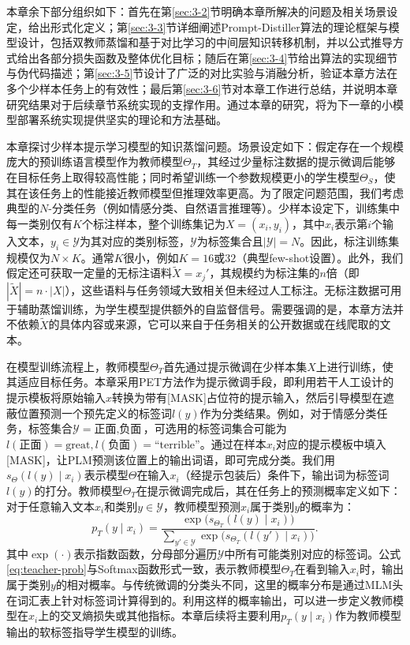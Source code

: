 \documentclass[../main.tex]{subfiles}
\begin{document}
本章余下部分组织如下：首先在第\ref{sec:3-2}节明确本章所解决的问题及相关场景设定，给出形式化定义；第\ref{sec:3-3}节详细阐述Prompt-Distiller算法的理论框架与模型设计，包括双教师蒸馏和基于对比学习的中间层知识转移机制，并以公式推导方式给出各部分损失函数及整体优化目标；随后在第\ref{sec:3-4}节给出算法的实现细节与伪代码描述；第\ref{sec:3-5}节设计了广泛的对比实验与消融分析，验证本章方法在多个少样本任务上的有效性；最后第\ref{sec:3-6}节对本章工作进行总结，并说明本章研究结果对于后续章节系统实现的支撑作用。通过本章的研究，将为下一章的小模型部署系统实现提供坚实的理论和方法基础。

\label{sec:3-2}
本章探讨少样本提示学习模型的知识蒸馏问题。场景设定如下：假定存在一个规模庞大的预训练语言模型作为教师模型$\Theta_T$，其经过少量标注数据的提示微调后能够在目标任务上取得较高性能；同时希望训练一个参数规模更小的学生模型$\Theta_S$，使其在该任务上的性能接近教师模型但推理效率更高。为了限定问题范围，我们考虑典型的$N$-分类任务（例如情感分类、自然语言推理等）。少样本设定下，训练集中每一类别仅有$K$个标注样本，整个训练集记为$X={(x_i, y_i)}$，其中$x_i$表示第$i$个输入文本，$y_i \in \mathcal{Y}$为其对应的类别标签，$\mathcal{Y}$为标签集合且$|\mathcal{Y}| = N$。因此，标注训练集规模仅为$N \times K$。通常$K$很小，例如$K=16$或$32$（典型few-shot设置）。此外，我们假定还可获取一定量的无标注语料$\tilde{X}={x_j'}$，其规模约为标注集的$n$倍（即$|\tilde{X}| = n\cdot |X|$），这些语料与任务领域大致相关但未经过人工标注。无标注数据可用于辅助蒸馏训练，为学生模型提供额外的自监督信号。需要强调的是，本章方法并不依赖$\tilde{X}$的具体内容或来源，它可以来自于任务相关的公开数据或在线爬取的文本。

在模型训练流程上，教师模型$\Theta_T$首先通过提示微调在少样本集$X$上进行训练，使其适应目标任务。本章采用PET方法作为提示微调手段，即利用若干人工设计的提示模板将原始输入$x$转换为带有[MASK]占位符的提示输入，然后引导模型在遮蔽位置预测一个预先定义的标签词$l(y)$作为分类结果。例如，对于情感分类任务，标签集合$\mathcal{Y}={\text{正面}, \text{负面}}$，可选用的标签词集合可能为 ${l(\text{正面})=\text{great}, l(\text{负面})=\text{“terrible”}}$。通过在样本$x_i$对应的提示模板中填入[MASK]，让PLM预测该位置上的输出词语，即可完成分类。我们用$s_{\Theta}(l(y)\mid x_i)$表示模型$\Theta$在输入$x_i$（经提示包装后）条件下，输出词为标签词$l(y)$的打分。教师模型$\Theta_T$在提示微调完成后，其在任务上的预测概率定义如下：对于任意输入文本$x_i$和类别$y\in\mathcal{Y}$，教师模型预测$x_i$属于类别$y$的概率为：
\begin{equation}
	\label{eq:teacher-prob}
	p_{T}(y \mid x_i) = \frac{\exp\big(s_{\Theta_T}(l(y)\mid x_i)\big)}{\displaystyle\sum_{y' \in \mathcal{Y}} \exp\big(s_{\Theta_T}(l(y')\mid x_i)\big)} .
\end{equation}
其中$\exp(\cdot)$表示指数函数，分母部分遍历$\mathcal{Y}$中所有可能类别对应的标签词。公式\eqref{eq:teacher-prob}与Softmax函数形式一致，表示教师模型$\Theta_T$在看到输入$x_i$时，输出属于类别$y$的相对概率。与传统微调的分类头不同，这里的概率分布是通过MLM头在词汇表上针对标签词计算得到的。利用这样的概率输出，可以进一步定义教师模型在$x_i$上的交叉熵损失或其他指标。本章后续将主要利用$p_T(y\mid x_i)$作为教师模型输出的软标签指导学生模型的训练。
\end{document}
